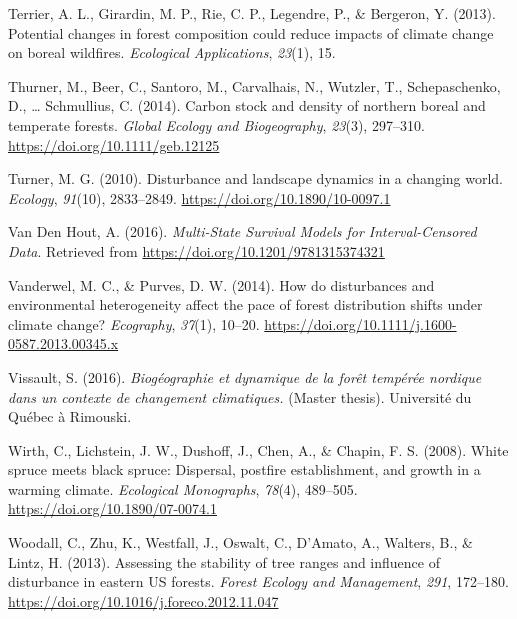 \documentclass[a4paperpaper,]{article}
\begin{document}
\leavevmode\hypertarget{ref-terrier_potential_2013}{}%
Terrier, A. L., Girardin, M. P., Rie, C. P., Legendre, P., \& Bergeron,
Y. (2013). Potential changes in forest composition could reduce impacts
of climate change on boreal wildﬁres. \emph{Ecological Applications},
\emph{23}(1), 15.

\leavevmode\hypertarget{ref-thurner_carbon_2014}{}%
Thurner, M., Beer, C., Santoro, M., Carvalhais, N., Wutzler, T.,
Schepaschenko, D., \ldots{} Schmullius, C. (2014). Carbon stock and
density of northern boreal and temperate forests. \emph{Global Ecology
and Biogeography}, \emph{23}(3), 297--310.
\url{https://doi.org/10.1111/geb.12125}

\leavevmode\hypertarget{ref-turner_disturbance_2010}{}%
Turner, M. G. (2010). Disturbance and landscape dynamics in a changing
world. \emph{Ecology}, \emph{91}(10), 2833--2849.
\url{https://doi.org/10.1890/10-0097.1}

\leavevmode\hypertarget{ref-van_den_hout_multi-state_2016}{}%
Van Den Hout, A. (2016). \emph{Multi-State Survival Models for
Interval-Censored Data}. Retrieved from
\url{https://doi.org/10.1201/9781315374321}

\leavevmode\hypertarget{ref-vanderwel_how_2014}{}%
Vanderwel, M. C., \& Purves, D. W. (2014). How do disturbances and
environmental heterogeneity affect the pace of forest distribution
shifts under climate change? \emph{Ecography}, \emph{37}(1), 10--20.
\url{https://doi.org/10.1111/j.1600-0587.2013.00345.x}

\leavevmode\hypertarget{ref-vissault_biogeographie_2016}{}%
Vissault, S. (2016). \emph{Biogéographie et dynamique de la forêt
tempérée nordique dans un contexte de changement climatiques.} (Master
thesis). Université du Québec à Rimouski.

\leavevmode\hypertarget{ref-wirth_white_2008}{}%
Wirth, C., Lichstein, J. W., Dushoff, J., Chen, A., \& Chapin, F. S.
(2008). White spruce meets black spruce: Dispersal, postfire
establishment, and growth in a warming climate. \emph{Ecological
Monographs}, \emph{78}(4), 489--505.
\url{https://doi.org/10.1890/07-0074.1}

\leavevmode\hypertarget{ref-woodall_assessing_2013}{}%
Woodall, C., Zhu, K., Westfall, J., Oswalt, C., D'Amato, A., Walters,
B., \& Lintz, H. (2013). Assessing the stability of tree ranges and
influence of disturbance in eastern US forests. \emph{Forest Ecology and
Management}, \emph{291}, 172--180.
\url{https://doi.org/10.1016/j.foreco.2012.11.047}
\end{document}

